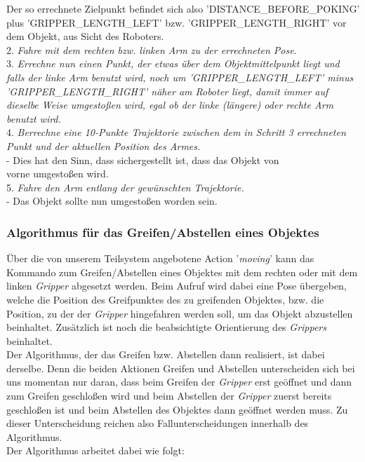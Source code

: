 \documentclass{suturo}
\begin{document}
Der so errechnete Zielpunkt befindet sich also 'DISTANCE\_BEFORE\_POKING' plus 'GRIPPER\_LENGTH\_LEFT' bzw. 'GRIPPER\_LENGTH\_RIGHT' vor dem Objekt, aus Sicht des Roboters.\\

2. \textit{Fahre mit dem rechten bzw. linken Arm zu der errechneten Pose.}\\

3. \textit{Errechne nun einen Punkt, der etwas über dem Objektmittelpunkt liegt und falls der linke Arm benutzt wird, noch um 'GRIPPER\_LENGTH\_LEFT' minus 'GRIPPER\_LENGTH\_RIGHT' näher am Roboter liegt, damit immer auf dieselbe Weise umgestoßen wird, egal ob der linke (längere) oder rechte Arm benutzt wird.}\\

4. \textit{Berrechne eine 10-Punkte Trajektorie zwischen dem in Schritt 3 errechneten Punkt und der aktuellen Position des Armes.}\\
\tab - Dies hat den Sinn, dass sichergestellt ist, dass das Objekt von\\ \tab vorne umgestoßen wird.\\

5. \textit{Fahre den Arm entlang der gewünschten Trajektorie.}\\
\tab - Das Objekt sollte nun umgestoßen worden sein.


\subsubsection{Algorithmus für das Greifen/Abstellen eines Objektes}
Über die von unserem Teilsystem angebotene Action '\textit{moving}' kann das Kommando zum Greifen/Abstellen eines Objektes mit dem rechten oder mit dem linken \textit{Gripper} abgesetzt werden. Beim Aufruf wird dabei eine Pose übergeben, welche die Position des Greifpunktes des zu greifenden Objektes, bzw. die Position, zu der der \textit{Gripper} hingefahren werden soll, um das Objekt abzustellen beinhaltet. Zusätzlich ist noch die beabsichtigte Orientierung des \textit{Grippers} beinhaltet. \\Der Algorithmus, der das Greifen bzw. Abstellen dann realisiert, ist dabei derselbe. Denn die beiden Aktionen Greifen und Abstellen unterscheiden sich bei uns momentan nur daran, dass beim Greifen der \textit{Gripper} erst geöffnet und dann zum Greifen geschloßen wird und beim Abstellen der \textit{Gripper} zuerst bereits geschloßen ist und beim Abstellen des Objektes dann geöffnet werden muss. Zu dieser Unterscheidung reichen also Fallunterscheidungen innerhalb des Algorithmus. \\Der Algorithmus arbeitet dabei wie folgt:\\
\end{document}
